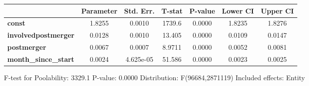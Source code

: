 \documentclass{report}
\begin{document}
\begin{center}
\begin{tabular}{lcccccc}
                             & \textbf{Parameter} & \textbf{Std. Err.} & \textbf{T-stat} & \textbf{P-value} & \textbf{Lower CI} & \textbf{Upper CI}  \\
\midrule
\textbf{const}               &       1.8255       &       0.0010       &      1739.6     &      0.0000      &       1.8235      &       1.8276       \\
\textbf{involvedpostmerger}  &       0.0128       &       0.0010       &      13.405     &      0.0000      &       0.0109      &       0.0147       \\
\textbf{postmerger}          &       0.0067       &       0.0007       &      8.9711     &      0.0000      &       0.0052      &       0.0081       \\
\textbf{month\_since\_start} &       0.0024       &     4.625e-05      &      51.586     &      0.0000      &       0.0023      &       0.0025       \\
\bottomrule
\end{tabular}
\end{center}

F-test for Poolability: 3329.1 \newline
 P-value: 0.0000 \newline
 Distribution: F(96684,2871119) \newline
  \newline
 Included effects: Entity
\end{document}

